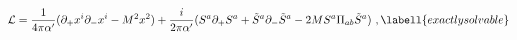 \begin{equation}
  \mathcal{L} = \frac{1}{4\pi\alpha'}
  (\partial_+ x^i\partial_- x^i - M^2x^2)
  +\frac{i}{2\pi\alpha'}
  (S^a\partial_ + S^a + \tilde{S}^a\partial_-\tilde{S}^a 
  - 2MS^a\Pi_{ab}\tilde{S}^a)\ ,
\labell{exactlysolvable}
\end{equation}

